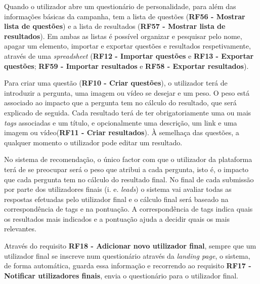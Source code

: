 Quando o utilizador abre um questionário de personalidade, para além das informações básicas da campanha, tem a lista de questões (\textbf{RF56 - Mostrar lista de questões}) e a lista de resultados (\textbf{RF57 - Mostrar lista de resultados}). Em ambas as listas é possível organizar e pesquisar pelo nome, apagar um elemento, importar e exportar questões e resultados respetivamente, através de uma \textit{spreadsheet} (\textbf{RF12 - Importar questões} e \textbf{RF13 - Exportar questões}; \textbf{RF59 - Importar resultados} e \textbf{RF58 - Exportar resultados}).

Para criar uma questão (\textbf{RF10 - Criar questões}), o utilizador terá de introduzir a pergunta, uma imagem ou vídeo se desejar e um peso. O peso está associado ao impacto que a pergunta tem no cálculo do resultado, que será explicado de seguida. 
Cada resultado terá de ter obrigatoriamente uma ou mais \textit{tags} associadas e um título, e opcionalmente uma descrição, um link e uma imagem ou vídeo(\textbf{RF11 - Criar resultados}). À semelhaça das questões, a qualquer momento o utilizador pode editar um resultado.

No sistema de recomendação, o único factor com que o utilizador da plataforma terá de se preocupar será o peso que atribui a cada pergunta, isto é, o impacto que cada pergunta tem no cálculo do resultado final. No final de cada submissão por parte dos utilizadores finais (i. e. \textit{leads}) o sistema vai avaliar todas as respostas efetuadas pelo utilizador final e o cálculo final será baseado na correspondência de tags e na pontuação. A correspondência de tags indica quais os resultados mais indicados e a pontuação ajuda a decidir quais os mais relevantes.

Através do requisito \textbf{RF18 - Adicionar novo utilizador final}, sempre que um utilizador final se inscreve num questionário através da \textit{landing page}, o sistema, de forma automática, guarda essa informação e recorrendo ao requisito \textbf{RF17 - Notificar utilizadores finais}, envia o questionário para o utilizador final.

\pagebreak

